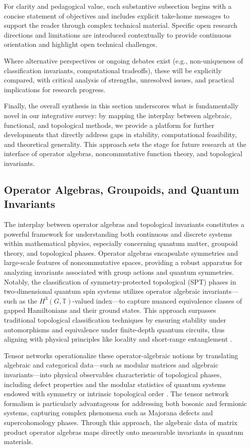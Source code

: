 \documentclass[sigconf]{acmart}
\begin{document}
For clarity and pedagogical value, each substantive subsection begins with a concise statement of objectives and includes explicit take-home messages to support the reader through complex technical material. Specific open research directions and limitations are introduced contextually to provide continuous orientation and highlight open technical challenges.

Where alternative perspectives or ongoing debates exist (e.g., non-uniqueness of classification invariants, computational tradeoffs), these will be explicitly compared, with critical analysis of strengths, unresolved issues, and practical implications for research progress.

Finally, the overall synthesis in this section underscores what is fundamentally novel in our integrative survey: by mapping the interplay between algebraic, functional, and topological methods, we provide a platform for further developments that directly address gaps in stability, computational feasibility, and theoretical generality. This approach sets the stage for future research at the interface of operator algebras, noncommutative function theory, and topological invariants.

\subsection{Operator Algebras, Groupoids, and Quantum Invariants}

The interplay between operator algebras and topological invariants constitutes a powerful framework for understanding both continuous and discrete systems within mathematical physics, especially concerning quantum matter, groupoid theory, and topological phases. Operator algebras encapsulate symmetries and large-scale features of noncommutative spaces, providing a robust apparatus for analyzing invariants associated with group actions and quantum symmetries. Notably, the classification of symmetry-protected topological (SPT) phases in two-dimensional quantum spin systems utilizes operator algebraic invariants—such as the $H^3(G, \mathbb{T})$-valued index—to capture nuanced equivalence classes of gapped Hamiltonians and their ground states. This approach surpasses traditional topological classification techniques by ensuring stability under automorphisms and equivalence under finite-depth quantum circuits, thus aligning with physical principles like locality and short-range entanglement \cite{ref18}.

Tensor networks operationalize these operator-algebraic notions by translating algebraic and categorical data—such as modular matrices and algebraic invariants—into physical observables characteristic of topological phases, including defect properties and the modular statistics of quantum systems endowed with symmetry or intrinsic topological order \cite{ref21}. The tensor network formalism is particularly advantageous for addressing both bosonic and fermionic systems, capturing complex phenomena such as Majorana defects and supercohomology phases. Through this approach, the algebraic data of matrix product operator algebras maps directly onto measurable invariants in quantum materials.
\end{document}
